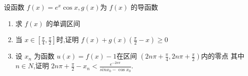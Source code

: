 \documentclass[class=ctexart,crop=false]{standalone}
\begin{document}
设函数 $f(x)=e^x\cos{x},g(x)$为 $f(x)$ 的导函数
\begin{enumerate}[label=(\Roman*)]
    \item 求 $f(x)$ 的单调区间
    \item 当 $x \in [\frac{\pi}{4},\frac{\pi}{2}]$时,证明 $f(x)+g(x)(\frac{\pi}{2}-x)\geqslant0$
    \item 设 $x_n$ 为函数 $u(x)=f(x)-1$在区间 $(2n\pi+\frac{\pi}{4},2n\pi+\frac{\pi}{2})$内的零点
            其中 $n \in N$,证明 $2n\pi+\frac{\pi}{2}-x_n < \frac{e^{-2n\pi}}{sin{x_0-\cos{x_0}}}$.
\end{enumerate}
\end{document}
